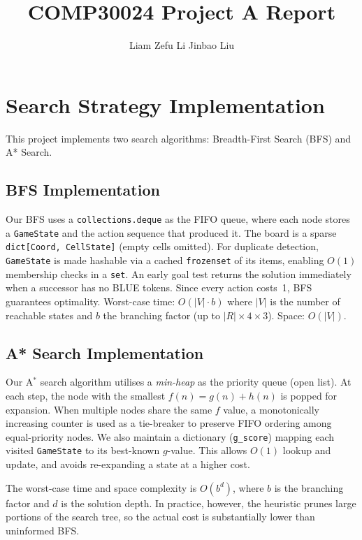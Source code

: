 \documentclass[runningheads]{llncs}
\begin{document}
\title{COMP30024 Project A Report}
\author{Liam Zefu Li \hspace{4cm} Jinbao Liu}

\maketitle
\thispagestyle{fancy}

\section{Search Strategy Implementation}
This project implements two search algorithms: Breadth-First Search (BFS) and A* Search.

\subsection{BFS Implementation}
Our BFS uses a \texttt{collections.deque} as the FIFO queue, where each node stores a \texttt{GameState} and the action sequence that produced it. The board is a sparse \texttt{dict[Coord,\,CellState]} (empty cells omitted). For duplicate detection, \texttt{GameState} is made hashable via a cached \texttt{frozenset} of its items, enabling $O(1)$ membership checks in a \texttt{set}. An early goal test returns the solution immediately when a successor has no BLUE tokens. Since every action costs~1, BFS guarantees optimality. Worst-case time: $O(|V| \cdot b)$ where $|V|$ is the number of reachable states and $b$ the branching factor (up to $|R| \times 4 \times 3$). Space: $O(|V|)$.

\subsection{A* Search Implementation}
Our A$^*$ search algorithm utilises a \textit{min-heap} as the priority queue (open list). At each step, the node with the smallest $f(n) = g(n) + h(n)$ is popped for expansion. When multiple nodes share the same $f$ value, a monotonically increasing counter is used as a tie-breaker to preserve FIFO ordering among equal-priority nodes. We also maintain a dictionary (\texttt{g\_score}) mapping each visited \texttt{GameState} to its best-known $g$-value. This allows $O(1)$ lookup and update, and avoids re-expanding a state at a higher cost.

The worst-case time and space complexity is $O(b^d)$, where $b$ is the branching factor and $d$ is the solution depth. In practice, however, the heuristic prunes large portions of the search tree, so the actual cost is substantially lower than uninformed BFS.
\end{document}

